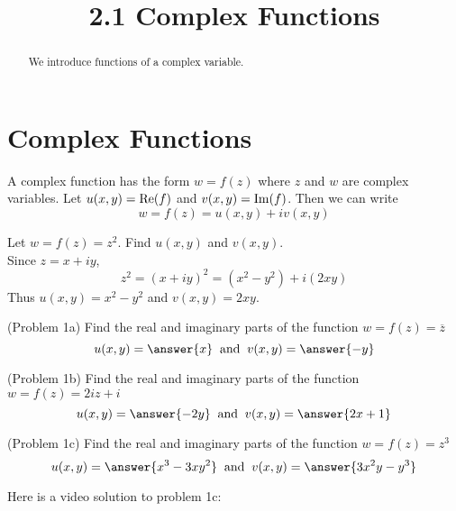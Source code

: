 \documentclass[handout]{ximera}
\title{2.1 Complex Functions}
\begin{document}
\begin{abstract}
We introduce functions of a complex variable.
\end{abstract}

\maketitle

\section{Complex Functions}

A complex function has the form $w = f(z)$ where $z$ and $w$ are complex variables.
Let $u(x,y) = \operatorname{Re}(f)$ and $v(x,y) = \operatorname{Im}(f)$. Then we can write 
\[
w = f(z) = u(x,y) + iv(x,y)
\]



\begin{example}[Example 1] 
Let $w = f(z) = z^2$. Find $u(x,y)$ and $v(x,y)$.\\
Since $z = x+iy$, 
\[
z^2 = (x+iy)^2 = \left(x^2 - y^2\right) + i(2xy)
\]
Thus $u(x,y) = x^2 - y^2$ and $v(x,y) = 2xy$.

\end{example}




\begin{problem}(Problem 1a)
Find the real and imaginary parts of the function $w = f(z) = \overline{z}$
\[
u(x,y) = \answer{x} \;\; \mbox{and} \;\; v(x,y) = \answer{-y}
\]

\end{problem}


\begin{problem}(Problem 1b)
Find the real and imaginary parts of the function $w = f(z) = 2iz+i$     
\[
u(x,y) = \answer{-2y} \;\; \mbox{and} \;\; v(x,y) = \answer{2x+1}
\]

\end{problem}


\begin{problem}(Problem 1c)
Find the real and imaginary parts of the function $w = f(z) = z^3$   
\[
u(x,y) = \answer{x^3 - 3xy^2} \;\; \mbox{and} \;\; v(x,y) = \answer{3x^2y -y^3}
\]

\end{problem}

Here is a video solution to problem 1c:\\
\begin{foldable}
\end{foldable}
\end{document}
